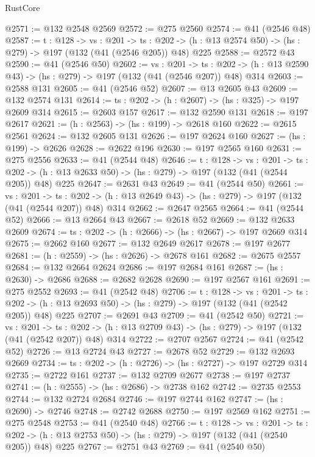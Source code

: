 \begin{lexlean}{RustCore}
\begin{coremodule}
@2571 := @132 @2548 @2569
@2572 := @275 @2560
@2574 := @41 (@2546 @48)
@2587 := {t : @128} ->
  {vs : @201} ->
  {ts : @202} -> (h : @13 @2574 @50) -> (hs : @279) -> @197 (@132 (@41 (@2546 @205)) @48) @225
@2588 := @2572 @43
@2590 := @41 (@2546 @50)
@2602 := {vs : @201} ->
  {ts : @202} -> (h : @13 @2590 @43) -> (hs : @279) -> @197 (@132 (@41 (@2546 @207)) @48) @314
@2603 := @2588 @131
@2605 := @41 (@2546 @52)
@2607 := @13 @2605 @43
@2609 := @132 @2574 @131
@2614 := {ts : @202} -> (h : @2607) -> (hs : @325) -> @197 @2609 @314
@2615 := @2603 @157
@2617 := @132 @2590 @131
@2618 := @197 @2617
@2621 := (h : @2563) -> (hs : @199) -> @2618 @160
@2622 := @2615 @2561
@2624 := @132 @2605 @131
@2626 := @197 @2624 @160
@2627 := (hs : @199) -> @2626
@2628 := @2622 @196
@2630 := @197 @2565 @160
@2631 := @275 @2556
@2633 := @41 (@2544 @48)
@2646 := {t : @128} ->
  {vs : @201} ->
  {ts : @202} -> (h : @13 @2633 @50) -> (hs : @279) -> @197 (@132 (@41 (@2544 @205)) @48) @225
@2647 := @2631 @43
@2649 := @41 (@2544 @50)
@2661 := {vs : @201} ->
  {ts : @202} -> (h : @13 @2649 @43) -> (hs : @279) -> @197 (@132 (@41 (@2544 @207)) @48) @314
@2662 := @2647 @2565
@2664 := @41 (@2544 @52)
@2666 := @13 @2664 @43
@2667 := @2618 @52
@2669 := @132 @2633 @2609
@2674 := {ts : @202} -> (h : @2666) -> (hs : @2667) -> @197 @2669 @314
@2675 := @2662 @160
@2677 := @132 @2649 @2617
@2678 := @197 @2677
@2681 := (h : @2559) -> (hs : @2626) -> @2678 @161
@2682 := @2675 @2557
@2684 := @132 @2664 @2624
@2686 := @197 @2684 @161
@2687 := (hs : @2630) -> @2686
@2688 := @2682 @2628
@2690 := @197 @2567 @161
@2691 := @275 @2552
@2693 := @41 (@2542 @48)
@2706 := {t : @128} ->
  {vs : @201} ->
  {ts : @202} -> (h : @13 @2693 @50) -> (hs : @279) -> @197 (@132 (@41 (@2542 @205)) @48) @225
@2707 := @2691 @43
@2709 := @41 (@2542 @50)
@2721 := {vs : @201} ->
  {ts : @202} -> (h : @13 @2709 @43) -> (hs : @279) -> @197 (@132 (@41 (@2542 @207)) @48) @314
@2722 := @2707 @2567
@2724 := @41 (@2542 @52)
@2726 := @13 @2724 @43
@2727 := @2678 @52
@2729 := @132 @2693 @2669
@2734 := {ts : @202} -> (h : @2726) -> (hs : @2727) -> @197 @2729 @314
@2735 := @2722 @161
@2737 := @132 @2709 @2677
@2738 := @197 @2737
@2741 := (h : @2555) -> (hs : @2686) -> @2738 @162
@2742 := @2735 @2553
@2744 := @132 @2724 @2684
@2746 := @197 @2744 @162
@2747 := (hs : @2690) -> @2746
@2748 := @2742 @2688
@2750 := @197 @2569 @162
@2751 := @275 @2548
@2753 := @41 (@2540 @48)
@2766 := {t : @128} ->
  {vs : @201} ->
  {ts : @202} -> (h : @13 @2753 @50) -> (hs : @279) -> @197 (@132 (@41 (@2540 @205)) @48) @225
@2767 := @2751 @43
@2769 := @41 (@2540 @50)

\end{coremodule}
\end{lexlean}
